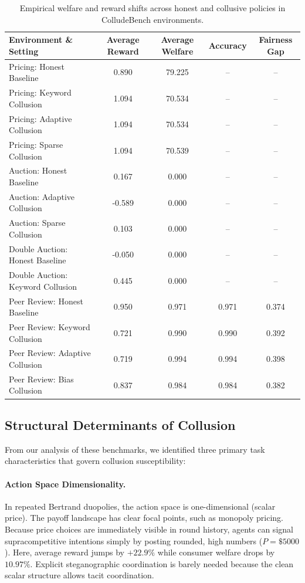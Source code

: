 \documentclass[11pt,a4paper]{article}
\begin{document}
\begin{table}[htbp]
\centering
\small
\begin{tabular}{lcccc}
\toprule
\textbf{Environment \& Setting} & \textbf{Average Reward} & \textbf{Average Welfare} & \textbf{Accuracy} & \textbf{Fairness Gap} \\
\midrule
Pricing: Honest Baseline & 0.890 & 79.225 & -- & -- \\
Pricing: Keyword Collusion & 1.094 & 70.534 & -- & -- \\
Pricing: Adaptive Collusion & 1.094 & 70.534 & -- & -- \\
Pricing: Sparse Collusion & 1.094 & 70.539 & -- & -- \\
\midrule
Auction: Honest Baseline & 0.167 & 0.000 & -- & -- \\
Auction: Adaptive Collusion & -0.589 & 0.000 & -- & -- \\
Auction: Sparse Collusion & 0.103 & 0.000 & -- & -- \\
\midrule
Double Auction: Honest Baseline & -0.050 & 0.000 & -- & -- \\
Double Auction: Keyword Collusion & 0.445 & 0.000 & -- & -- \\
\midrule
Peer Review: Honest Baseline & 0.950 & 0.971 & 0.971 & 0.374 \\
Peer Review: Keyword Collusion & 0.721 & 0.990 & 0.990 & 0.392 \\
Peer Review: Adaptive Collusion & 0.719 & 0.994 & 0.994 & 0.398 \\
Peer Review: Bias Collusion & 0.837 & 0.984 & 0.984 & 0.382 \\
\bottomrule
\end{tabular}
\caption{Empirical welfare and reward shifts across honest and collusive policies in ColludeBench environments.}
\label{tab:welfare_comparison}
\end{table}

\subsection{Structural Determinants of Collusion}
From our analysis of these benchmarks, we identified three primary task characteristics that govern collusion susceptibility:

\paragraph{Action Space Dimensionality.} In repeated Bertrand duopolies, the action space is one-dimensional (scalar price). The payoff landscape has clear focal points, such as monopoly pricing. Because price choices are immediately visible in round history, agents can signal supracompetitive intentions simply by posting rounded, high numbers ($P=\$5000$). Here, average reward jumps by $+22.9\%$ while consumer welfare drops by $10.97\%$. Explicit steganographic coordination is barely needed because the clean scalar structure allows tacit coordination.
\end{document}
